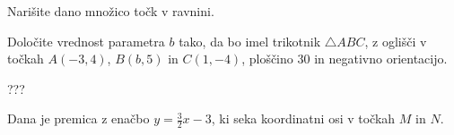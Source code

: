 \documentclass[addpoints]{exam}
\begin{document}
\begin{questions}


    \question
    Narišite dano množico točk v ravnini.
    \begin{parts}
        \part[4]
        $\{-1,2,3\} \times [-1,2)$

            \begin{solution}[7cm]
                ????
            \end{solution}

        \part[4]
        $\left\{(x,y)\in\mathbb{R}^2 \mid (x<2)\land (y=x+1)\right\} $

            \begin{solution}[5.5cm]
                ????
            \end{solution}

    \end{parts}
    
    
    \newpage

    \question[5]
    Določite vrednost parametra $b$ tako, da bo imel trikotnik $\triangle ABC$, 
    z oglišči v točkah $A(-3,4)$, $B(b,5)$ in $C(1,-4)$, ploščino $30$ in negativno orientacijo.
    
    
    \begin{solution}[6cm]
        ???
    \end{solution}

        


    \question
    Dana je premica z enačbo $y=\frac{3}{2}x-3$, ki seka koordinatni osi v točkah $M$ in $N$.

\end{questions}
\end{document}
